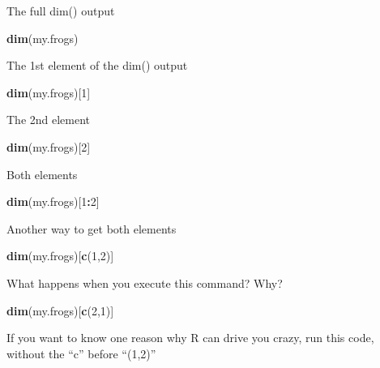 \documentclass[]{book}
\newenvironment{Shaded}{\begin{snugshade}}{\end{snugshade}}
\newcommand{\KeywordTok}[1]{\textcolor[rgb]{0.13,0.29,0.53}{\textbf{#1}}}
\newcommand{\DecValTok}[1]{\textcolor[rgb]{0.00,0.00,0.81}{#1}}
\newcommand{\OperatorTok}[1]{\textcolor[rgb]{0.81,0.36,0.00}{\textbf{#1}}}
\newcommand{\NormalTok}[1]{#1}
\theoremstyle{definition}
\theoremstyle{definition}
\theoremstyle{definition}
\theoremstyle{remark}
\begin{document}
The full dim() output

\begin{Shaded}
\begin{Highlighting}[]
\KeywordTok{dim}\NormalTok{(my.frogs)}
\end{Highlighting}
\end{Shaded}

The 1st element of the dim() output

\begin{Shaded}
\begin{Highlighting}[]
\KeywordTok{dim}\NormalTok{(my.frogs)[}\DecValTok{1}\NormalTok{]}
\end{Highlighting}
\end{Shaded}

The 2nd element

\begin{Shaded}
\begin{Highlighting}[]
\KeywordTok{dim}\NormalTok{(my.frogs)[}\DecValTok{2}\NormalTok{]}
\end{Highlighting}
\end{Shaded}

Both elements

\begin{Shaded}
\begin{Highlighting}[]
\KeywordTok{dim}\NormalTok{(my.frogs)[}\DecValTok{1}\OperatorTok{:}\DecValTok{2}\NormalTok{]}
\end{Highlighting}
\end{Shaded}

Another way to get both elements

\begin{Shaded}
\begin{Highlighting}[]
\KeywordTok{dim}\NormalTok{(my.frogs)[}\KeywordTok{c}\NormalTok{(}\DecValTok{1}\NormalTok{,}\DecValTok{2}\NormalTok{)]}
\end{Highlighting}
\end{Shaded}

What happens when you execute this command? Why?

\begin{Shaded}
\begin{Highlighting}[]
\KeywordTok{dim}\NormalTok{(my.frogs)[}\KeywordTok{c}\NormalTok{(}\DecValTok{2}\NormalTok{,}\DecValTok{1}\NormalTok{)]}
\end{Highlighting}
\end{Shaded}

If you want to know one reason why R can drive you crazy, run this code,
without the ``c'' before ``(1,2)''
\end{document}
